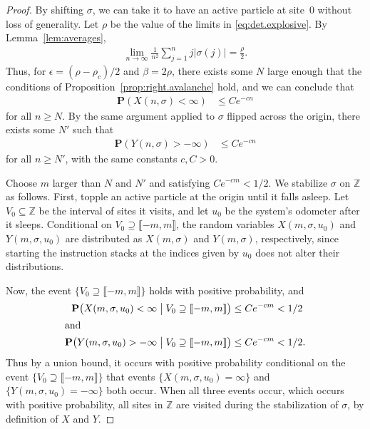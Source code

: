 \documentclass[10pt,a4paper]{amsart}
\begin{document}
\setcounter{section}{2}
\setcounter{equation}{5}
\setcounter{theorem}{5}
\begin{proof}
By shifting $\sigma $, we can take it to have an active particle at site~$0$
without loss of generality. Let $\rho $ be the value of the limits in
\eqref{eq:det.explosive}. By Lemma~\ref{lem:averages},
%
\begin{align*}
\lim _{n\to \infty}\frac{1}{n^{2}}\sum _{j=1}^{n} j\mathopen{\lvert }\sigma (j)\mathclose{\rvert }=
\frac{\rho }{2}.
\end{align*}
%
Thus, for $\epsilon =(\rho -\rho _{c})/2$ and $\beta = 2\rho $, there exists
some $N$ large enough that the conditions of Proposition~\ref{prop:right.avalanche}
hold, and we can conclude that
%
\begin{align*}
\mathbf{P}(X(n, \sigma )<\infty ) &\leq Ce^{-cn}
\end{align*}
%
for all $n\geq N$. By the same argument applied to $\sigma $ flipped across
the origin, there exists some $N'$ such that
%
\begin{align*}
\mathbf{P}(Y(n, \sigma )>-\infty ) &\leq Ce^{-cn}
\end{align*}
%
for all $n\geq N'$, with the same constants $c,C>0$.

Choose $m$ larger than $N$ and $N'$ and satisfying $Ce^{-cm}<1/2$. We stabilize
$\sigma $ on $\mathbb{Z}$ as follows. First, topple an active particle
at the origin until it falls asleep. Let $V_{0}\subseteq \mathbb{Z}$ be
the interval of sites it visits, and let $u_{0}$ be the system's odometer
after it sleeps. Conditional on $V_{0} \supseteq \mathopen{\llbracket }-m,m \mathclose{\rrbracket }$, the random
variables $X(m, \sigma , u_{0})$ and $Y(m, \sigma , u_{0})$ are distributed
as $X(m,\sigma )$ and $Y(m,\sigma )$, respectively, since starting the
instruction stacks at the indices given by $u_{0}$ does not alter their
distributions.

Now, the event $\{V_{0} \supseteq \mathopen{\llbracket }-m,m \mathclose{\rrbracket }\}$ holds with positive probability,
and
%
\begin{align*}
\mathbf{P}\bigl(X(m, \sigma , u_{0})<\infty \;\big \vert \;V_{0}
\supseteq \mathopen{\llbracket }-m,m \mathclose{\rrbracket }\bigr)&\leq Ce^{-cm}<1/2
\\
\intertext{and} \mathbf{P}\bigl(Y(m, \sigma , u_{0})>-\infty \;
\big \vert \;V_{0} \supseteq \mathopen{\llbracket }-m,m \mathclose{\rrbracket }\bigr)&\leq Ce^{-cm}<1/2.
\end{align*}
%
Thus by a union bound, it occurs with positive probability conditional
on the event $\{V_{0} \supseteq \mathopen{\llbracket }-m,m \mathclose{\rrbracket }\}$ that events
$\{X(m, \sigma , u_{0})=\infty \}$ and
$\{Y(m, \sigma , u_{0})=-\infty \}$ both occur. When all three events occur,
which occurs with positive probability, all sites in $\mathbb{Z}$ are visited
during the stabilization of $\sigma $, by definition of $X$ and $Y$.
\end{proof}
\end{document}
